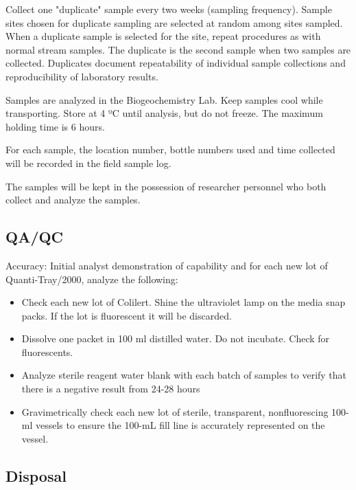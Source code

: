 \documentclass[12pt]{../SOP4_alpha}\usepackage[]{graphicx}\usepackage[]{color}
\begin{document}
\NP Collect one "duplicate" sample every two weeks (sampling frequency).
Sample sites chosen for duplicate sampling are selected at random among
sites sampled. When a duplicate sample is selected for the site, repeat
procedures as with normal stream samples. The duplicate is the second
sample when two samples are collected. Duplicates document repeatability of
individual sample collections and reproducibility of laboratory results.

\NP Samples are analyzed in the Biogeochemistry Lab. Keep samples cool
while transporting. Store at 4 ºC until analysis, but do not freeze. The
maximum holding time is 6 hours.

\NP For each sample, the location number, bottle numbers used and time
collected will be recorded in the field sample log.

\NP The samples will be kept in the possession of researcher personnel who both
collect and analyze the samples.

\subsection{QA/QC}

\NP Accuracy: Initial analyst demonstration of capability and for each new lot of
Quanti-Tray/2000, analyze the following:

\begin{itemize}

\item Check each new lot of Colilert. Shine the ultraviolet lamp on the media snap packs. If the lot is
fluorescent it will be discarded.

\item Dissolve one packet in 100 ml distilled water. Do not incubate.
Check for fluorescents.

\item Analyze sterile reagent water blank with each batch of samples to
verify that there is a negative result from 24-28 hours

\item Gravimetrically check each new lot of sterile, transparent, nonfluorescing 100-ml vessels to ensure the 100-mL fill line is
accurately represented on the vessel. 

\end{itemize}

\subsection{Disposal}
\end{document}
